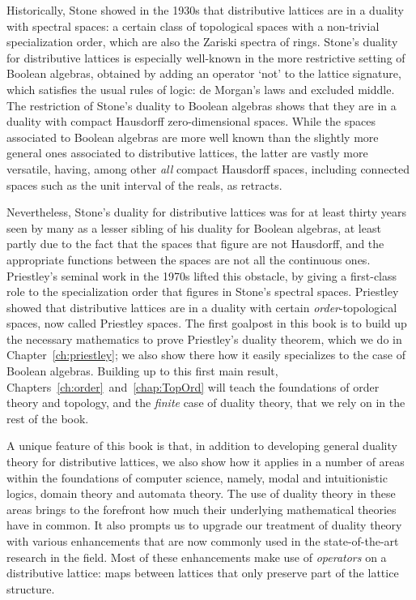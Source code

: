 Historically, Stone showed in the 1930s that distributive lattices are in a duality with spectral spaces: a certain class of topological spaces with a non-trivial specialization order, which are also the Zariski spectra of rings. Stone's duality for distributive lattices is especially well-known in the  more restrictive setting of Boolean algebras, obtained by adding an operator `not' to the lattice signature, which satisfies the usual rules of logic: de Morgan's laws and excluded middle. The restriction of Stone's duality to Boolean algebras shows that they are in a duality with compact Hausdorff zero-dimensional spaces. While the spaces associated to Boolean algebras are more well known than the slightly more general ones associated to distributive lattices, the latter are vastly more versatile, having, among other \emph{all} compact Hausdorff spaces, including connected spaces such as the unit interval of the reals, as retracts.

Nevertheless, Stone's duality for distributive lattices was for at least thirty years seen by many as a lesser sibling of his duality for Boolean algebras, at least partly due to the fact that the spaces that figure are not Hausdorff, and the appropriate functions between the spaces are not all the continuous ones. Priestley's seminal work in the 1970s lifted this obstacle, by giving a first-class role to the specialization order that figures in Stone's spectral spaces. Priestley showed that distributive lattices are in a duality with certain \emph{order}-topological spaces, now called Priestley spaces. The first goalpost in this book is to build up the necessary mathematics to prove Priestley's duality theorem, which we do in Chapter~\ref{ch:priestley}; we also show there how it easily specializes to the case of Boolean algebras. Building up to this first main result, Chapters~\ref{ch:order}~and~\ref{chap:TopOrd} will teach the foundations of order theory and topology, and the \emph{finite} case of duality theory, that we rely on in the rest of the book. 

A unique feature of this book is that, in addition to developing general duality theory for distributive lattices, we also show how it applies in a number of areas within the foundations of computer science, namely, modal and intuitionistic logics, domain theory and automata theory. The use of duality theory in these areas brings to the forefront how much their underlying mathematical theories have in common. It also prompts us to upgrade our treatment of duality theory with various enhancements that are now commonly used in the state-of-the-art research in the field.
Most of these enhancements make use of \emph{operators} on a distributive lattice: maps between lattices that only preserve part of the lattice structure.

